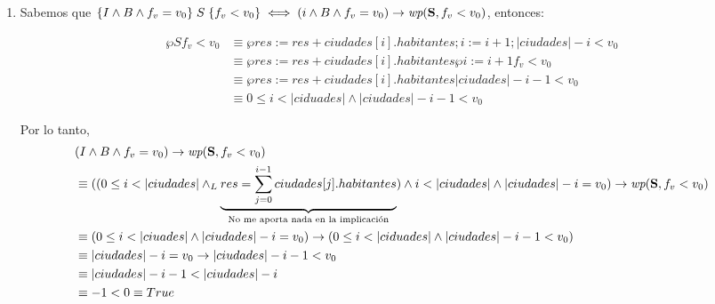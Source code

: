 \documentclass[10pt,a4paper]{article}
\begin{document}
\begin{enumerate}
	\item {}

	      Sabemos que $\hoare{I \land B \land f_v = v_0}{S}{f_v < v_0} \iff (i \land B \land f_v = v_0) \Then \wp{S}{f_v < v_0}$, entonces:

	      \begin{align*}
		      \wp{S}{f_v < v_0} & \equiv \wp{res := res + ciudades[i].habitantes; i := i + 1;}{|ciudades| - i < v_0} \\
		                        & \equiv \wp{res := res + ciudades[i].habitantes}{\wp{i := i + 1}{f_v < v_0}}        \\
		                        & \equiv \wp{res := res + ciudades[i].habitantes}{|ciudades| - i - 1 < v_0}          \\
		                        & \equiv 0 \leq i < |ciduades| \land |ciudades| - i - 1 < v_0
	      \end{align*}

	      Por lo tanto,
	      \begin{align*}
		       & (I \land B \land f_v = v_0) \Then \wp{S}{f_v < v_0}                                                                                                                                                                          \\
		       & \equiv ((0 \leq i < |ciudades| \yLuego \underbrace{res = \sum_{j = 0}^{i - 1} ciudades[j].habitantes}_{\text{No me aporta nada en la implicación}}) \land i < |ciudades| \land |ciudades| - i = v_0) \Then \wp{S}{f_v < v_0} \\
		       & \equiv (0 \leq i < |ciuades| \land |ciudades| - i = v_0) \Then (0 \leq i < |ciduades| \land |ciudades| - i - 1 < v_0)                                                                                                        \\
		       & \equiv |ciudades| - i = v_0 \Then |ciudades| - i - 1 < v_0                                                                                                                                                                   \\
		       & \equiv |ciudades| - i - 1 < |ciudades| - i                                                                                                                                                                                   \\
		       & \equiv -1 < 0 \equiv True
	      \end{align*}


\end{enumerate}
\end{document}
